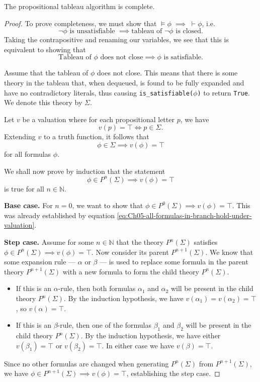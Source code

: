 \begin{theorem}
    The propositional tableau algorithm is complete.
\end{theorem}
\begin{proof}
    To prove completeness, we must show that \(\models\phi\;\implies\;\vdash\phi\), i.e.
    \[\neg\phi \text{ is unsatisfiable } \implies \text{tableau of } \neg\phi \text{ is closed.}\]
    Taking the contrapositive and renaming our variables, we see that this is equivalent to showing that
    \[\text{Tableau of } \phi \text{ does not close} \implies \phi \text{ is satisfiable.}\]

    Assume that the tableau of \(\phi\) does not close. This means that there is some theory in the tableau that, when dequeued, is found to be fully expanded and have no contradictory literals, thus causing \verb|is_satisfiable(|\(\phi\)\verb|)| to return \texttt{True}. We denote this theory by \(\Sigma\).

    Let \(v\) be a valuation where for each propositional letter \(p\), we have
    \[v(p) = \top \iff p \in \Sigma\text{.}\]
    Extending \(v\) to a truth function, it follows that
    \begin{equation}\label{eq:Ch05-all-formulas-in-branch-hold-under-valuation}
        \phi\in\Sigma\implies v(\phi) = \top\tag{*}
    \end{equation}
    for all formulas \(\phi\).

    We shall now prove by induction that the statement
    \[\phi \in P^n (\Sigma) \implies v(\phi) = \top\]
    is true for all \(n \in \mathbb{N}\).

    \textbf{Base case.} For \(n = 0\), we want to show that \(\phi \in P^0 (\Sigma) \implies v(\phi) = \top\). This was already established by equation \eqref{eq:Ch05-all-formulas-in-branch-hold-under-valuation}.

    \textbf{Step case.} Assume for some \(n \in \mathbb{N}\) that the theory \(P^n (\Sigma)\) satisfies \(\phi \in P^n (\Sigma) \implies v(\phi) = \top\). Now consider its parent \(P^{n+1}(\Sigma)\). We know that some expansion rule --- \(\alpha\) or \(\beta\) --- is used to replace some formula in the parent theory \(P^{n+1}(\Sigma)\) with a new formula to form the child theory \(P^n (\Sigma)\).
    \begin{itemize}
        \item If this is an \(\alpha\)-rule, then both formulas \(\alpha_1\) and \(\alpha_2\) will be present in the child theory \(P^n (\Sigma)\). By the induction hypothesis, we have \(v(\alpha_1) = v(\alpha_2) = \top\), so \(v(\alpha) = \top\).
        \item If this is an \(\beta\)-rule, then one of the formulas \(\beta_1\) and \(\beta_2\) will be present in the child theory \(P^n (\Sigma)\). By the induction hypothesis, we have either \(v(\beta_1) = \top\) or \(v(\beta_2) = \top\). In either case we have \(v(\beta) = \top\).
    \end{itemize}
    Since no other formulas are changed when generating \(P^n (\Sigma)\) from \(P^{n+1} (\Sigma)\), we have \(\phi \in P^{n+1} (\Sigma) \implies v(\phi) = \top\), establishing the step case.


\end{proof}
